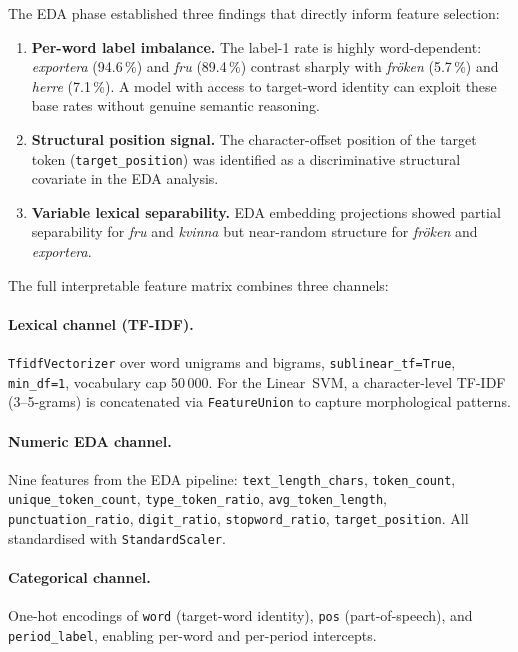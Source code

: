 The EDA phase established three findings that directly inform feature selection:
\begin{enumerate}
  \item \textbf{Per-word label imbalance.} The label-1 rate is highly
    word-dependent: \emph{exportera} (94.6\,\%) and \emph{fru} (89.4\,\%)
    contrast sharply with \emph{fr\"{o}ken} (5.7\,\%) and
    \emph{herre} (7.1\,\%).  A model with access to target-word identity
    can exploit these base rates without genuine semantic reasoning.
  \item \textbf{Structural position signal.} The character-offset position of
    the target token (\texttt{target\_position}) was identified as a
    discriminative structural covariate in the EDA analysis.
  \item \textbf{Variable lexical separability.} EDA embedding projections
    showed partial separability for \emph{fru} and \emph{kvinna} but
    near-random structure for \emph{fr\"{o}ken} and \emph{exportera}.
\end{enumerate}

The full interpretable feature matrix combines three channels:

\paragraph{Lexical channel (TF-IDF).}
\texttt{TfidfVectorizer} over word unigrams and bigrams,
\texttt{sublinear\_tf=True}, \texttt{min\_df=1}, vocabulary cap 50\,000.
For the Linear~SVM, a character-level TF-IDF (3--5-grams) is concatenated
via \texttt{FeatureUnion} to capture morphological patterns.

\paragraph{Numeric EDA channel.}
Nine features from the EDA pipeline:
\texttt{text\_length\_chars}, \texttt{token\_count},
\texttt{unique\_token\_count}, \texttt{type\_token\_ratio},
\texttt{avg\_token\_length}, \texttt{punctuation\_ratio},
\texttt{digit\_ratio}, \texttt{stopword\_ratio},
\texttt{target\_position}. All standardised with \texttt{StandardScaler}.

\paragraph{Categorical channel.}
One-hot encodings of \texttt{word} (target-word identity),
\texttt{pos} (part-of-speech), and \texttt{period\_label},
enabling per-word and per-period intercepts.

